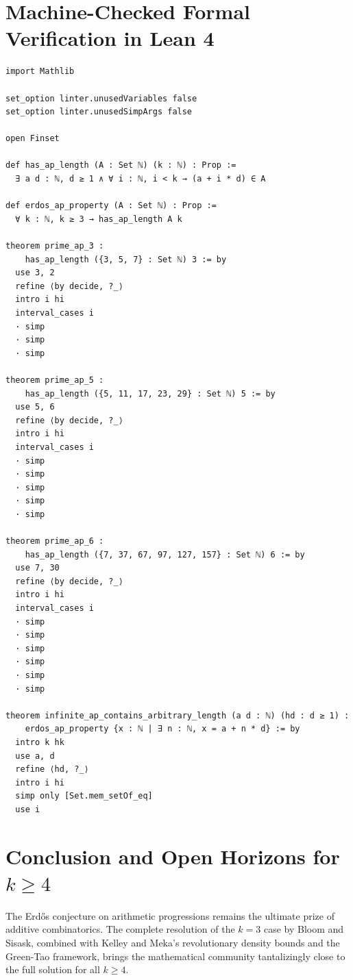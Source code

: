 \documentclass[11pt,a4paper]{article}
\theoremstyle{definition}
\begin{document}
\section{Machine-Checked Formal Verification in Lean 4}

\begin{lstlisting}[caption={Formal Lean 4 Implementation of Arithmetic Progression Predicates and Certificates}]
import Mathlib

set_option linter.unusedVariables false
set_option linter.unusedSimpArgs false

open Finset

def has_ap_length (A : Set ℕ) (k : ℕ) : Prop :=
  ∃ a d : ℕ, d ≥ 1 ∧ ∀ i : ℕ, i < k → (a + i * d) ∈ A

def erdos_ap_property (A : Set ℕ) : Prop :=
  ∀ k : ℕ, k ≥ 3 → has_ap_length A k

theorem prime_ap_3 :
    has_ap_length ({3, 5, 7} : Set ℕ) 3 := by
  use 3, 2
  refine ⟨by decide, ?_⟩
  intro i hi
  interval_cases i
  · simp
  · simp
  · simp

theorem prime_ap_5 :
    has_ap_length ({5, 11, 17, 23, 29} : Set ℕ) 5 := by
  use 5, 6
  refine ⟨by decide, ?_⟩
  intro i hi
  interval_cases i
  · simp
  · simp
  · simp
  · simp
  · simp

theorem prime_ap_6 :
    has_ap_length ({7, 37, 67, 97, 127, 157} : Set ℕ) 6 := by
  use 7, 30
  refine ⟨by decide, ?_⟩
  intro i hi
  interval_cases i
  · simp
  · simp
  · simp
  · simp
  · simp
  · simp

theorem infinite_ap_contains_arbitrary_length (a d : ℕ) (hd : d ≥ 1) :
    erdos_ap_property {x : ℕ | ∃ n : ℕ, x = a + n * d} := by
  intro k hk
  use a, d
  refine ⟨hd, ?_⟩
  intro i hi
  simp only [Set.mem_setOf_eq]
  use i
\end{lstlisting}

\section{Conclusion and Open Horizons for $k \ge 4$}
The Erd\H{o}s conjecture on arithmetic progressions remains the ultimate prize of additive combinatorics. The complete resolution of the $k=3$ case by Bloom and Sisask, combined with Kelley and Meka's revolutionary density bounds and the Green-Tao framework, brings the mathematical community tantalizingly close to the full solution for all $k \ge 4$.
\end{document}
